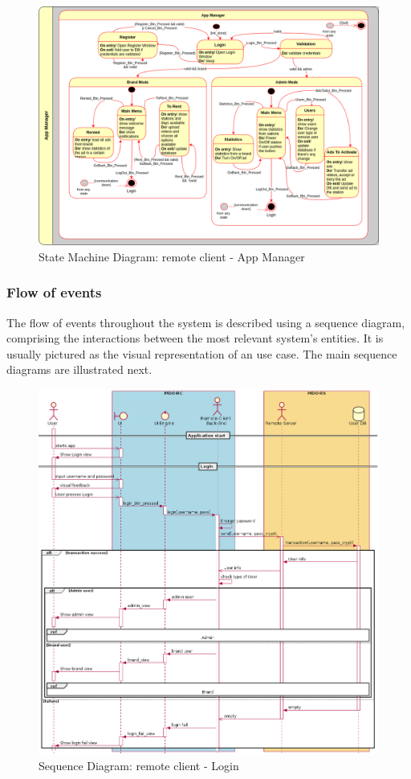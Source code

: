 %
\begin{figure}[htb!]
\centering
    \includegraphics[width=0.9\columnwidth]{./img/state-mach-rc-app-manag.png}
  \caption{State Machine Diagram: remote client - App Manager}%
\label{fig:state-mach-rc-app-manag}
\end{figure}
%
%
%

\subsubsection{Flow of events}
\label{sec:flow-events-1}
The flow of events throughout the system is described using a sequence diagram, comprising the interactions between the most relevant system's entities.
It is usually pictured as the visual representation of an use case. The main sequence diagrams are illustrated next.

\begin{figure}[htb!]
\centering
    \includegraphics[width=1\columnwidth]{./img/seq-rc-login.png}
  \caption{Sequence Diagram: remote client - Login}%
\label{fig:seq-rc-login}
\end{figure}

